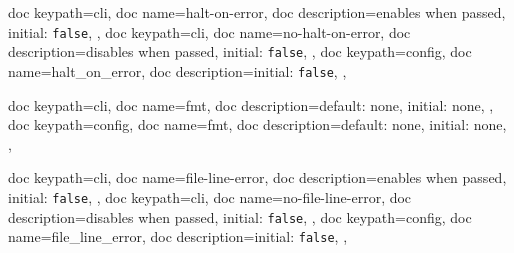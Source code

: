 \documentclass[a4paper, 11pt]{scrartcl}
\begin{document}
\begin{docKeys}[
	]{
		{
			doc keypath=cli,
			doc name=halt-on-error,
			doc description={enables when passed, initial: \texttt{false}},
		},
		{
			doc keypath=cli,
			doc name=no-halt-on-error,
			doc description={disables when passed, initial: \texttt{false}},
		},
		{
			doc keypath=config,
			doc name=halt_on_error,
			doc description={initial: \texttt{false}},
		},
	}
\end{docKeys}
\begin{docKeys}[
		doc parameter={=\meta{fmt}},
	]{
		{
			doc keypath=cli,
			doc name=fmt,
			doc description={default: none, initial: none},
		},
		{
			doc keypath=config,
			doc name=fmt,
			doc description={default: none, initial: none},
		},
	}
\end{docKeys}
\begin{docKeys}[
	]{
		{
			doc keypath=cli,
			doc name=file-line-error,
			doc description={enables when passed, initial: \texttt{false}},
		},
		{
			doc keypath=cli,
			doc name=no-file-line-error,
			doc description={disables when passed, initial: \texttt{false}},
		},
		{
			doc keypath=config,
			doc name=file_line_error,
			doc description={initial: \texttt{false}},
		},
	}
\end{docKeys}
\end{document}
